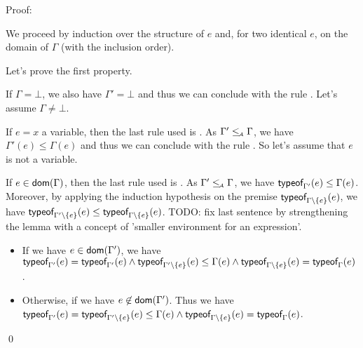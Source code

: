 \documentclass[a4paper]{article}
\theoremstyle{definition}
\begin{document}
  Proof:

  We proceed by induction over the structure of $e$
  and, for two identical $e$, on the domain of $\Gamma$ (with the inclusion order).

  Let's prove the first property.

  If $\Gamma = \bot$, we also have $\Gamma' = \bot$ and thus we can conclude with the rule .
  Let's assume $\Gamma \neq \bot$.

  If $e=x$ a variable, then the last rule used is .
  As $\Gamma' \leq_{\!\scriptscriptstyle\mathcal{A}} \Gamma$, we have $\Gamma'(e) \leq \Gamma(e)$ and thus
  we can conclude with the rule .
  So let's assume that $e$ is not a variable.

  If $e\in\textsf{dom}(\Gamma)$, then the last rule used is .
  As $\Gamma' \leq_{\!\scriptscriptstyle\mathcal{A}} \Gamma$, we have $\textsf{typeof}_{\Gamma'}(e) \leq \Gamma(e)$.
  Moreover, by applying the induction hypothesis on the premise $\textsf{typeof}_{\Gamma\setminus \{e\}}(e)$,
  we have $\textsf{typeof}_{\Gamma'\setminus \{e\}}(e) \leq \textsf{typeof}_{\Gamma\setminus \{e\}}(e)$. TODO: fix last sentence
  by strengthening the lemma with a concept of 'smaller environment for an expression'.
  \begin{itemize}
    \item If we have $e\in\textsf{dom}(\Gamma')$, we have
    $\textsf{typeof}_{\Gamma'}(e) = \textsf{typeof}_{\Gamma'}(e) \land \textsf{typeof}_{\Gamma'\setminus \{e\}}(e) \leq \Gamma(e)\land\textsf{typeof}_{\Gamma\setminus \{e\}}(e) = \textsf{typeof}_{\Gamma}(e)$.
    \item  Otherwise, if we have $e\not\in\textsf{dom}(\Gamma')$. Thus we have
    $\textsf{typeof}_{\Gamma'}(e) = \textsf{typeof}_{\Gamma'\setminus \{e\}}(e) \leq \Gamma(e) \land \textsf{typeof}_{\Gamma\setminus \{e\}}(e)=\textsf{typeof}_{\Gamma}(e)$.
  \end{itemize}


  \qed
\end{document}

